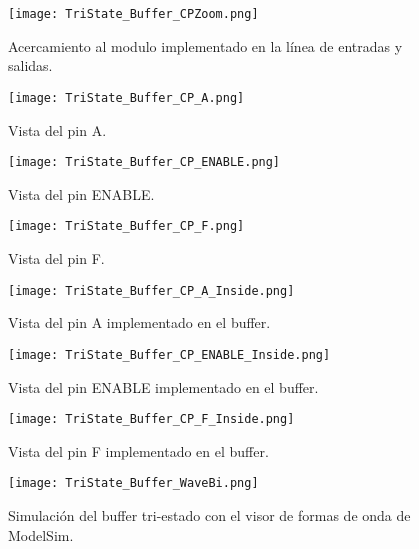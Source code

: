 \begin{figure}[ht]
	\centering
	\texttt{[image: TriState\_Buffer\_CPZoom.png]}
	\caption {Acercamiento al modulo implementado en la línea de entradas y salidas. \label{fig:tristate_buffer_CPZoom}}
\end{figure}

\begin{figure}[ht]
	\centering
	\texttt{[image: TriState\_Buffer\_CP\_A.png]}
	\caption{Vista del pin A. \label{fig:tristate_buffer_CP_A}}
\end{figure}

\begin{figure}[ht]
	\centering
	\texttt{[image: TriState\_Buffer\_CP\_ENABLE.png]}
	\caption{Vista del pin ENABLE. \label{fig:tristate_buffer_CP_ENABLE}}
\end{figure}

\begin{figure}[ht]
	\centering
	\texttt{[image: TriState\_Buffer\_CP\_F.png]}
	\caption{Vista del pin F. \label{fig:tristate_buffer_CP_F}}
\end{figure}

\begin{figure}[ht]
	\centering
	\texttt{[image: TriState\_Buffer\_CP\_A\_Inside.png]}
	\caption{Vista del pin A implementado en el buffer. \label{fig:tristate_buffer_CP_A_Inside}}
\end{figure}

\begin{figure}[ht]
	\centering
	\texttt{[image: TriState\_Buffer\_CP\_ENABLE\_Inside.png]}
	\caption{Vista del pin ENABLE implementado en el buffer. \label{fig:tristate_buffer_CP_ENABLE_Inside}}
\end{figure}

\begin{figure}[ht]
	\centering
	\texttt{[image: TriState\_Buffer\_CP\_F\_Inside.png]}
	\caption{Vista del pin F implementado en el buffer. \label{fig:tristate_buffer_CP_F_Inside}}
\end{figure}

\begin{figure}[ht]
	\centering
	\texttt{[image: TriState\_Buffer\_WaveBi.png]}
	\caption{Simulación del buffer tri-estado con el visor de formas de onda de ModelSim. \label{fig:tristate_buffer_WaveBi}}
\end{figure}